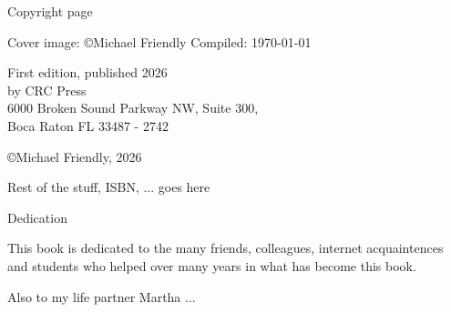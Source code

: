 
\thispagestyle{empty}

{\Large Copyright page}

Cover image: \copyright Michael Friendly
Compiled: \today

First edition, published 2026 \\
by CRC Press \\
6000 Broken Sound Parkway NW, Suite 300, \\
Boca Raton FL 33487 - 2742

\copyright Michael Friendly, 2026

Rest of the stuff, ISBN, ... goes here

\cleardoublepage

\begin{center}
{\Large Dedication}

This book is dedicated to the many friends, colleagues, internet acquaintences and students who helped over many years in what has become this book.

Also to my life partner Martha ...
\end{center}

\setlength{\abovedisplayskip}{-5pt}
\setlength{\abovedisplayshortskip}{-5pt}



\hfuzz=5.002pt

